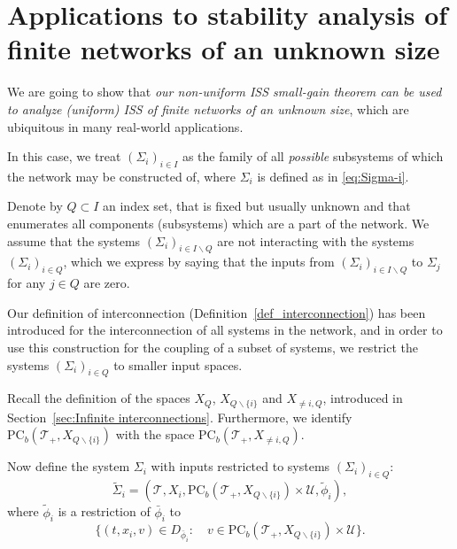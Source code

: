\documentclass[twocolumn]{IEEEtran} %
\theoremstyle{definition}
\newtheorem{remark}[theorem]{Remark}
\newcommand{\tm}{\times}%
\newcommand{\Uc}{\mathcal{U}}%
\newcommand{\KL}{\mathcal{KL}}%
\newcommand{\PC}{\mathrm{PC}}%
\newcommand{\T}{\ensuremath{\mathcal{T}}}  %
\begin{document}




\section{Applications to stability analysis of finite networks of an unknown size}
\label{sec:Analysis of finite networks of an unknown size}

We are going to show that \emph{our non-uniform ISS small-gain theorem can be used to analyze (uniform) ISS of finite networks of an unknown size}, which are ubiquitous in many real-world applications.


In this case, we treat $(\Sigma_i)_{i\in I}$ as the family of all \emph{possible} subsystems of which the network may be constructed of, where $\Sigma_i$ is defined as in \eqref{eq:Sigma-i}.

Denote by $Q \subset I$ an index set, that is fixed but usually unknown and that enumerates all components (subsystems) which are a part of the network. We assume that the systems $(\Sigma_i)_{i\in I\backslash Q}$ are not interacting with the systems $(\Sigma_i)_{i\in Q}$, which we express by saying that the inputs from $(\Sigma_i)_{i\in I\backslash Q}$ to $\Sigma_j$ for any $j\in Q$ are zero.

Our definition of interconnection (Definition~\ref{def_interconnection}) has been introduced for the interconnection of all systems in the network, and in order to use this construction for the coupling of a subset of systems, we restrict the systems $(\Sigma_i)_{i\in Q}$ to smaller input spaces.

Recall the definition of the spaces $X_Q$, $X_{Q\backslash\{i\}}$ and $X_{\neq i,Q}$, introduced in Section~\ref{sec:Infinite interconnections}. Furthermore, we identify $\PC_b(\T_+,X_{Q\backslash\{i\}})$ with the space $\PC_b(\T_+,X_{\neq i,Q})$.

Now define the system $\Sigma_i$ with inputs restricted to systems $(\Sigma_i)_{i\in Q}$:
\begin{equation}
\label{eq:Sigma-i-restricted}
  \tilde{\Sigma}_i = (\T, X_i,\PC_b(\T_+,X_{Q\backslash\{i\}}) \tm \Uc,\tilde{\phi}_i),%
\end{equation}
where $\tilde{\phi}_i$ is a restriction of $\bar{\phi}_i$ to 
\[
\{(t,x_i,v)\in D_{\bar{\phi}_i}:\quad v \in \PC_b(\T_+,X_{Q\backslash\{i\}}) \tm \Uc\}.
\]
\end{document}
